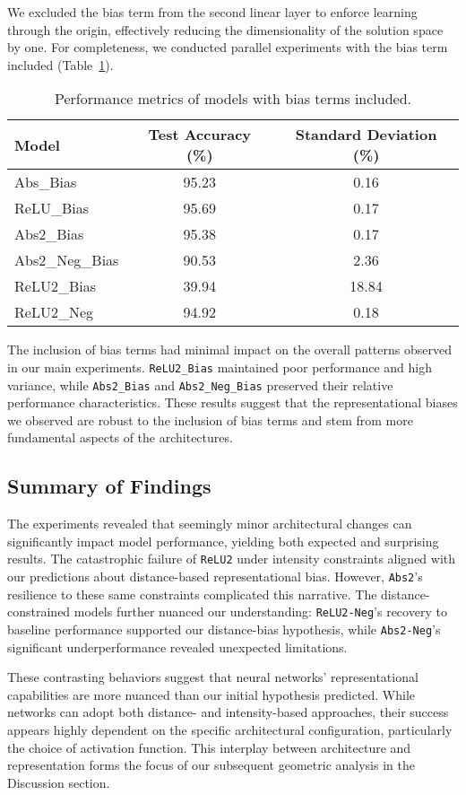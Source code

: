 We excluded the bias term from the second linear layer to enforce learning through the origin, effectively reducing the dimensionality of the solution space by one. For completeness, we conducted parallel experiments with the bias term included (Table~\ref{tab:biased_performance}).

\begin{table}[H]
    \centering
    \footnotesize
    \begin{tabular}{lcc}
        \toprule
        \textbf{Model} & \textbf{Test Accuracy (\%)} & \textbf{Standard Deviation (\%)} \\
        \midrule
        Abs\_Bias & 95.23 & 0.16 \\
        ReLU\_Bias & 95.69 & 0.17 \\
        \midrule
        Abs2\_Bias & 95.38 & 0.17 \\
        Abs2\_Neg\_Bias & 90.53 & 2.36 \\
        ReLU2\_Bias & 39.94 & 18.84 \\
        ReLU2\_Neg & 94.92 & 0.18 \\
        \bottomrule
    \end{tabular}
    \caption{Performance metrics of models with bias terms included.}
    \label{tab:biased_performance}
\end{table}

The inclusion of bias terms had minimal impact on the overall patterns observed in our main experiments. \texttt{ReLU2\_Bias} maintained poor performance and high variance, while \texttt{Abs2\_Bias} and \texttt{Abs2\_Neg\_Bias} preserved their relative performance characteristics. These results suggest that the representational biases we observed are robust to the inclusion of bias terms and stem from more fundamental aspects of the architectures.

\subsection{Summary of Findings}

The experiments revealed that seemingly minor architectural changes can significantly impact model performance, yielding both expected and surprising results. The catastrophic failure of \texttt{ReLU2} under intensity constraints aligned with our predictions about distance-based representational bias. However, \texttt{Abs2}'s resilience to these same constraints complicated this narrative. The distance-constrained models further nuanced our understanding: \texttt{ReLU2-Neg}'s recovery to baseline performance supported our distance-bias hypothesis, while \texttt{Abs2-Neg}'s significant underperformance revealed unexpected limitations.

These contrasting behaviors suggest that neural networks' representational capabilities are more nuanced than our initial hypothesis predicted. While networks can adopt both distance- and intensity-based approaches, their success appears highly dependent on the specific architectural configuration, particularly the choice of activation function. This interplay between architecture and representation forms the focus of our subsequent geometric analysis in the Discussion section.
